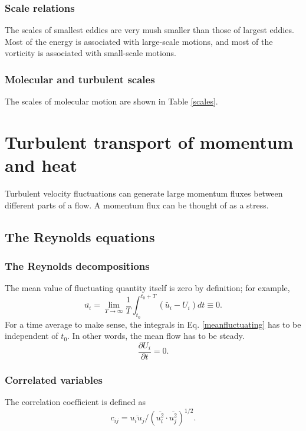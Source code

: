 \documentclass[review]{elsarticle}
\begin{document}
		\subsubsection{Scale relations}
			The scales of smallest eddies are very mush smaller than those of largest eddies. Most of the energy is associated with 
			large-scale motions, and most of the vorticity is associated with small-scale motions.
		\subsubsection{Molecular and turbulent scales}
			The scales of molecular motion are shown in Table \ref{scales}.
			
\section{Turbulent transport of momentum and heat}
	Turbulent velocity fluctuations can generate large momentum fluxes between different parts of a flow. A momentum flux can 
	be thought of as a stress.
	\subsection{The Reynolds equations}	
	\subsubsection{The Reynolds decompositions}
		The mean value of fluctuating quantity itself is zero by definition; for example,
		\begin{equation}\label{meanfluctuating}
			\bar{u_i} = \lim _{T \rightarrow \infty} \frac{1}{T} \int_{t_0}^{t_0 + T} (\tilde{u_i} - U_i)dt \equiv 0.
		\end{equation}
		For a time average to make sense, the integrals in Eq. \ref{meanfluctuating} has to be independent of $t_0$. In 
		other words, the mean flow has to be steady.
		\begin{equation}
			\frac{\partial U_i}{\partial t} = 0.
		\end{equation}
		
	\subsubsection{Correlated variables}
		The correlation coefficient is defined as 
		\begin{equation} \label{cij}
			c_{ij} = \overline{u_i u_j}/\left( \overline{u_i^2} \cdotp \overline{u_j^2}\right)^{1/2}.
		\end{equation}
\end{document}
